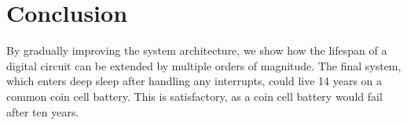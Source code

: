 \section{Conclusion}
By gradually improving the system architecture, we show how the lifespan of a digital circuit can be extended by multiple orders of magnitude.
The final system, which enters deep sleep after handling any interrupts, could live 14 years on a common coin cell battery.
This is satisfactory, as a coin cell battery would fail after ten years.

